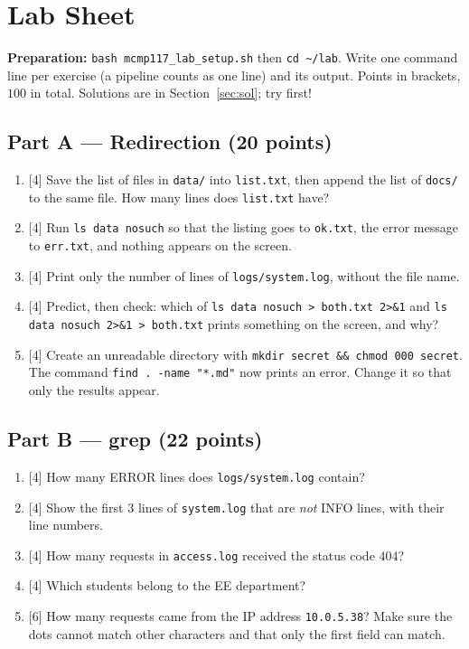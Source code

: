 \documentclass[11pt,a4paper]{article}
\newcommand{\cmd}[1]{\texttt{#1}}
\begin{document}
\section{Lab Sheet}
\label{sec:lab}

\textbf{Preparation:} \cmd{bash mcmp117\_lab\_setup.sh} then \cmd{cd \textasciitilde/lab}. Write one command line per exercise (a pipeline counts as one line) and its output. Points in brackets, $100$ in total. Solutions are in Section~\ref{sec:sol}; try first!

\subsection*{Part A --- Redirection (20 points)}
\begin{enumerate}[leftmargin=2.2em,label=\textbf{A\arabic*}]
  \item {[4]} Save the list of files in \texttt{data/} into \texttt{list.txt}, then append the list of \texttt{docs/} to the same file. How many lines does \texttt{list.txt} have?
  \item {[4]} Run \cmd{ls data nosuch} so that the listing goes to \texttt{ok.txt}, the error message to \texttt{err.txt}, and nothing appears on the screen.
  \item {[4]} Print only the number of lines of \texttt{logs/system.log}, without the file name.
  \item {[4]} Predict, then check: which of \cmd{ls data nosuch > both.txt 2>\&1} and \cmd{ls data nosuch 2>\&1 > both.txt} prints something on the screen, and why?
  \item {[4]} Create an unreadable directory with \cmd{mkdir secret \&\& chmod 000 secret}. The command \cmd{find . -name "*.md"} now prints an error. Change it so that only the results appear.
\end{enumerate}

\subsection*{Part B --- grep (22 points)}
\begin{enumerate}[leftmargin=2.2em,label=\textbf{B\arabic*}]
  \item {[4]} How many ERROR lines does \texttt{logs/system.log} contain?
  \item {[4]} Show the first $3$ lines of \texttt{system.log} that are \emph{not} INFO lines, with their line numbers.
  \item {[4]} How many requests in \texttt{access.log} received the status code $404$?
  \item {[4]} Which students belong to the EE department?
  \item {[6]} How many requests came from the IP address \texttt{10.0.5.38}? Make sure the dots cannot match other characters and that only the first field can match.
\end{enumerate}
\end{document}
